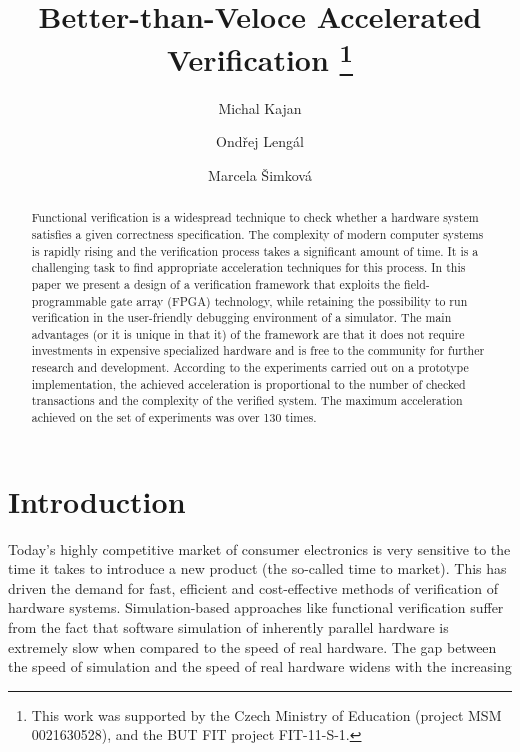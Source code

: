 \documentclass[draft]{llncs}
\title{Better-than-Veloce Accelerated Verification
\thanks{This work was supported by the Czech Ministry of Education (project
MSM 0021630528), and the BUT FIT project FIT-11-S-1.}\vspace*{-0mm}}
\author{Michal Kajan%
\and  Ond\v{r}ej Leng\'{a}l%
\and  Marcela \v{S}imkov\'{a}%
}
\institute{ {FIT, Brno University of Technology, Czech Republic}
}
\begin{document}
 

\maketitle

\vspace*{-0mm}\begin{abstract}Functional verification is a widespread technique 
to check whether a hardware system satisfies a given correctness specification. 
The complexity of modern computer systems is rapidly rising and the 
verification process takes a significant amount of time. It is a challenging 
task to find appropriate acceleration techniques for this process. In this 
paper we present a design of a verification framework that exploits the 
field-programmable gate array (FPGA) technology, while retaining the 
possibility to run verification in the user-friendly debugging environment of a 
simulator. The main advantages (or it is unique in that it) of the framework 
are that it does not require investments in expensive specialized hardware and 
is free to the community for further research and development. According to the 
experiments carried out on a prototype implementation, the achieved 
acceleration is proportional to the number of checked transactions and the 
complexity of the verified system. The maximum acceleration achieved on the set 
of experiments was over 130 times.\end{abstract}
\vspace*{-0mm}\section{Introduction}\vspace*{-0mm}
Today's highly competitive market of consumer electronics is very sensitive to the 
time it takes to introduce a new product (the so-called time to market). This has 
driven the demand for fast, efficient and cost-effective methods of verification 
of hardware systems. Simulation-based approaches like functional verification 
suffer from the fact that software simulation of inherently parallel hardware is 
extremely slow when compared to the speed of real hardware. The gap between the 
speed of simulation and the speed of real hardware widens with the increasing 
\end{document}
